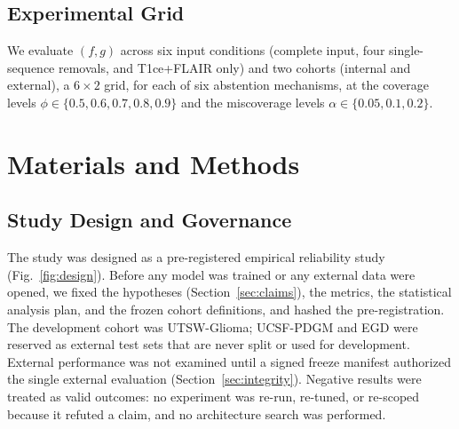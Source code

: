 \documentclass[journal]{IEEEtran}
\begin{document}
\subsection{Experimental Grid}
We evaluate $(f,g)$ across six input conditions (complete input, four single-sequence removals, and T1ce+FLAIR only) and two cohorts (internal and external), a $6\times2$ grid, for each of six abstention mechanisms, at the coverage levels $\phi\in\{0.5,0.6,0.7,0.8,0.9\}$ and the miscoverage levels $\alpha\in\{0.05,0.1,0.2\}$.

\section{Materials and Methods}
\label{sec:methods}

\subsection{Study Design and Governance}
The study was designed as a pre-registered empirical reliability study (Fig.~\ref{fig:design}). Before any model was trained or any external data were opened, we fixed the hypotheses (Section~\ref{sec:claims}), the metrics, the statistical analysis plan, and the frozen cohort definitions, and hashed the pre-registration. The development cohort was UTSW-Glioma; UCSF-PDGM and EGD were reserved as external test sets that are never split or used for development. External performance was not examined until a signed freeze manifest authorized the single external evaluation (Section~\ref{sec:integrity}). Negative results were treated as valid outcomes: no experiment was re-run, re-tuned, or re-scoped because it refuted a claim, and no architecture search was performed.
\end{document}
